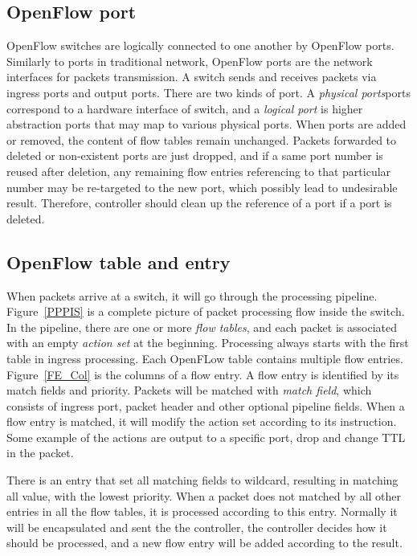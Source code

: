 \subsection{OpenFlow port}
\label{OpenFlow port}
OpenFlow switches are logically connected to one another by OpenFlow ports. Similarly to ports in traditional network, OpenFlow ports are the network interfaces for packets transmission. A switch sends and receives packets via ingress ports and output ports. There are two kinds of port. A \textit{physical ports}ports correspond to a hardware interface of switch, and a \textit{logical port} is higher abstraction ports that may map to various physical ports. When ports are added or removed, the content of flow tables remain unchanged. Packets forwarded to deleted or non-existent ports are just dropped, and if a same port number is reused after deletion, any remaining flow entries referencing to that particular number may be re-targeted to the new port, which possibly lead to undesirable result. Therefore, controller should clean up the reference of a port if a port is deleted. \cite{OF_SPEC}

\subsection{OpenFlow table and entry}
\label{OpenFlow table and entry}
When packets arrive at a switch, it will go through the processing pipeline. Figure~\ref{PPPIS} is a complete picture of packet processing flow inside the switch. In the pipeline, there are one or more \textit{flow tables}, and each packet is associated with an empty \textit{action set} at the beginning. Processing always starts with the first table in ingress processing. Each OpenFLow table contains multiple flow entries. Figure~\ref{FE_Col} is the columns of a flow entry. A flow entry is identified by its match fields and priority. Packets will be matched with \textit{match field}, which consists of ingress port, packet header and other optional pipeline fields. When a flow entry is matched, it will modify the action set according to its instruction. Some example of the actions are output to a specific port, drop and change TTL in the packet.

There is an entry that set all matching fields to wildcard, resulting in matching all value, with the lowest priority. When a packet does not matched by all other entries in all the flow tables, it is processed according to this entry. Normally it will be encapsulated and sent the the controller, the controller decides how it should be processed, and a new flow entry will be added according to the result.

